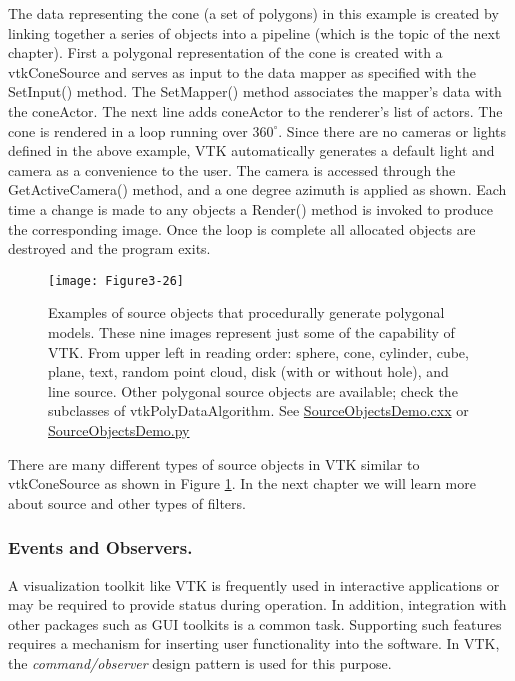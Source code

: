 The data representing the cone (a set of polygons) in this example is created by linking together a series of objects into a pipeline (which is the topic of the next chapter). First a polygonal representation of the cone is created with a vtkConeSource and serves as input to the data mapper as specified with the SetInput() method. The SetMapper() method associates the mapper's data with the coneActor. The next line adds coneActor to the renderer's list of actors. The cone is rendered in a loop running over $360^\circ$. Since there are no cameras or lights defined in the above example, VTK automatically generates a default light and camera as a convenience to the user. The camera is accessed through the GetActiveCamera() method, and a one degree azimuth is applied as shown. Each time a change is made to any objects a Render() method is invoked to produce the corresponding image. Once the loop is complete all allocated objects are destroyed and the program exits.

\begin{figure}[!htb]
  \centering
  \texttt{[image: Figure3-26]}\\
  \caption{Examples of source objects that procedurally generate polygonal models. These nine images represent just some of the capability of VTK. From upper left in reading order: sphere, cone, cylinder, cube, plane, text, random point cloud, disk (with or without hole), and line source. Other polygonal source objects are available; check the subclasses of vtkPolyDataAlgorithm. See  \href{https://lorensen.github.io/VTKExamples/site/Cxx/GeometricObjects/SourceObjectsDemo/}{SourceObjectsDemo.cxx} or \href{https://lorensen.github.io/VTKExamples/site/Python/GeometricObjects/SourceObjectsDemo/}{SourceObjectsDemo.py}}\label{fig:Figure3-26}
\end{figure}

There are many different types of source objects in VTK similar to vtkConeSource as shown in Figure \ref{fig:Figure3-26}. In the next chapter we will learn more about source and other types of filters.

\subsubsection{Events and Observers.}
\label{sub:events_observers}

A visualization toolkit like VTK is frequently used in interactive applications or may be required to provide status during operation. In addition, integration with other packages such as GUI toolkits is a common task. Supporting such features requires a mechanism for inserting user functionality into the software. In VTK, the \emph{command/observer}
 design pattern \cite{Gamma95} is used for this purpose.

